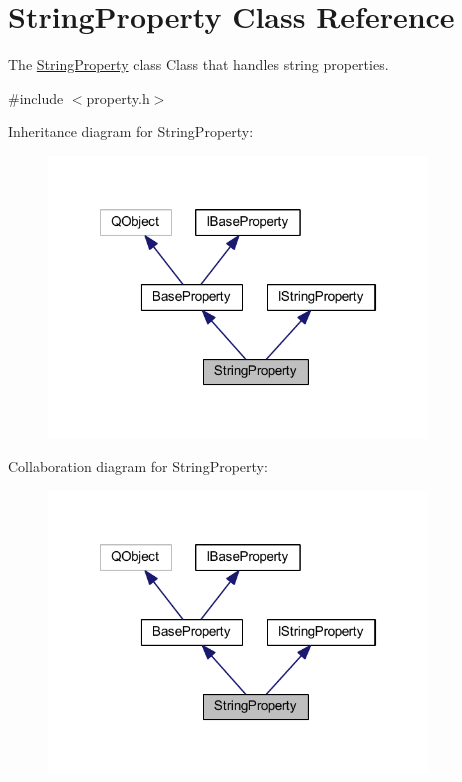 \hypertarget{class_string_property}{\section{String\-Property Class Reference}
\label{class_string_property}
}


The \hyperlink{class_string_property}{String\-Property} class Class that handles string properties.  




{\ttfamily \#include $<$property.\-h$>$}



Inheritance diagram for String\-Property\-:
\nopagebreak
\begin{figure}[H]
\begin{center}
\leavevmode
\includegraphics[width=285pt]{class_string_property__inherit__graph}
\end{center}
\end{figure}


Collaboration diagram for String\-Property\-:
\nopagebreak
\begin{figure}[H]
\begin{center}
\leavevmode
\includegraphics[width=285pt]{class_string_property__coll__graph}
\end{center}
\end{figure}
